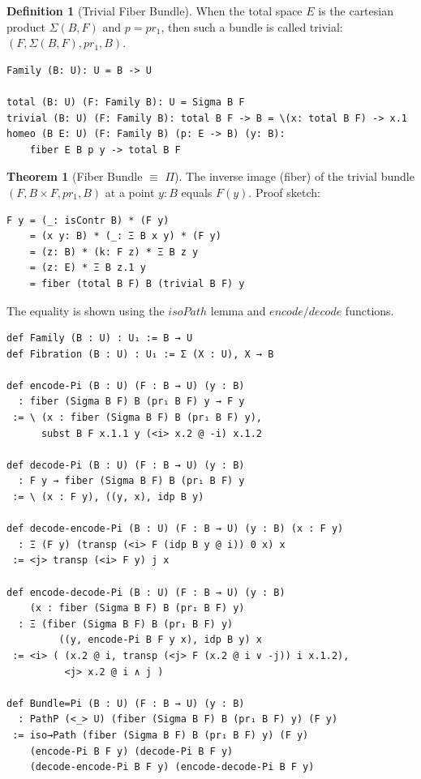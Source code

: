 \documentclass{article}
\theoremstyle{definition}
\newtheorem{definition}{Definition}
\newtheorem{theorem}{Theorem}
\begin{document}
\begin{definition}[Trivial Fiber Bundle]
When the total space \( E \) is the cartesian product \( \Sigma(B,F) \)
and \( p = pr_1 \), then such a bundle is called trivial: \( (F,\Sigma(B,F),pr_1,B) \).

\begin{lstlisting}[mathescape=true]
Family (B: U): U = B -> U

total (B: U) (F: Family B): U = Sigma B F
trivial (B: U) (F: Family B): total B F -> B = \(x: total B F) -> x.1
homeo (B E: U) (F: Family B) (p: E -> B) (y: B):
    fiber E B p y -> total B F
\end{lstlisting}
\end{definition}

\newpage
\begin{theorem}[Fiber Bundle $\equiv$ $\Pi$]
The inverse image (fiber) of the trivial bundle \( (F, B \times F, pr_1, B) \) at a point \( y: B \)
equals \( F(y) \). Proof sketch:
\begin{lstlisting}[mathescape=true]
F y = (_: isContr B) * (F y)
    = (x y: B) * (_: Ξ B x y) * (F y)
    = (z: B) * (k: F z) * Ξ B z y
    = (z: E) * Ξ B z.1 y
    = fiber (total B F) B (trivial B F) y
\end{lstlisting}
The equality is shown using the $isoPath$ lemma and $encode/decode$ functions.
\begin{lstlisting}[mathescape=true]
def Family (B : U) : U₁ := B → U
def Fibration (B : U) : U₁ := Σ (X : U), X → B

def encode-Pi (B : U) (F : B → U) (y : B)
  : fiber (Sigma B F) B (pr₁ B F) y → F y
 := \ (x : fiber (Sigma B F) B (pr₁ B F) y),
      subst B F x.1.1 y (<i> x.2 @ -i) x.1.2

def decode-Pi (B : U) (F : B → U) (y : B)
  : F y → fiber (Sigma B F) B (pr₁ B F) y
 := \ (x : F y), ((y, x), idp B y)

def decode-encode-Pi (B : U) (F : B → U) (y : B) (x : F y)
  : Ξ (F y) (transp (<i> F (idp B y @ i)) 0 x) x
 := <j> transp (<i> F y) j x

def encode-decode-Pi (B : U) (F : B → U) (y : B)
    (x : fiber (Sigma B F) B (pr₁ B F) y)
  : Ξ (fiber (Sigma B F) B (pr₁ B F) y)
         ((y, encode-Pi B F y x), idp B y) x
 := <i> ( (x.2 @ i, transp (<j> F (x.2 @ i ∨ -j)) i x.1.2),
          <j> x.2 @ i ∧ j )

def Bundle=Pi (B : U) (F : B → U) (y : B)
  : PathP (<_> U) (fiber (Sigma B F) B (pr₁ B F) y) (F y)
 := iso→Path (fiber (Sigma B F) B (pr₁ B F) y) (F y)
    (encode-Pi B F y) (decode-Pi B F y)
    (decode-encode-Pi B F y) (encode-decode-Pi B F y)
\end{lstlisting}
\end{theorem}
\end{document}

